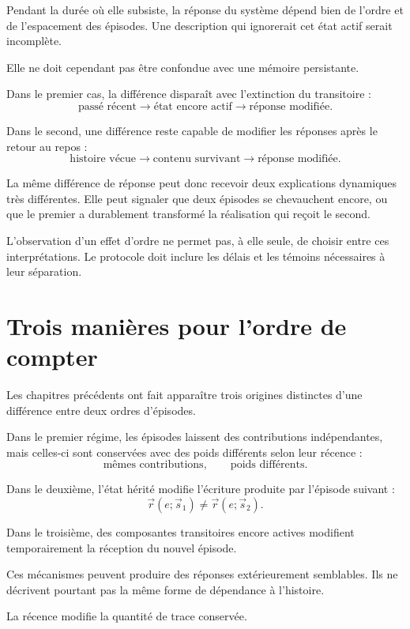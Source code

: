 Pendant la durée où elle subsiste, la réponse du système dépend bien de l'ordre et de l'espacement des épisodes. Une description qui ignorerait cet état actif serait incomplète.

Elle ne doit cependant pas être confondue avec une mémoire persistante.

Dans le premier cas, la différence disparaît avec l'extinction du transitoire :
\[
\text{passé récent}
\longrightarrow
\text{état encore actif}
\longrightarrow
\text{réponse modifiée}.
\]

Dans le second, une différence reste capable de modifier les réponses après le retour au repos :
\[
\text{histoire vécue}
\longrightarrow
\text{contenu survivant}
\longrightarrow
\text{réponse modifiée}.
\]

La même différence de réponse peut donc recevoir deux explications dynamiques très différentes. Elle peut signaler que deux épisodes se chevauchent encore, ou que le premier a durablement transformé la réalisation qui reçoit le second.

L'observation d'un effet d'ordre ne permet pas, à elle seule, de choisir entre ces interprétations. Le protocole doit inclure les délais et les témoins nécessaires à leur séparation.

\section{Trois manières pour l'ordre de compter}
\label{t3-trois-manieres-ordre}

Les chapitres précédents ont fait apparaître trois origines distinctes d'une différence entre deux ordres d'épisodes.

Dans le premier régime, les épisodes laissent des contributions indépendantes, mais celles-ci sont conservées avec des poids différents selon leur récence :
\[
\text{mêmes contributions},
\qquad
\text{poids différents}.
\]

Dans le deuxième, l'état hérité modifie l'écriture produite par l'épisode suivant :
\[
\vec r(e;\vec s_1)
\neq
\vec r(e;\vec s_2).
\]

Dans le troisième, des composantes transitoires encore actives modifient temporairement la réception du nouvel épisode.

Ces mécanismes peuvent produire des réponses extérieurement semblables. Ils ne décrivent pourtant pas la même forme de dépendance à l'histoire.

La récence modifie la quantité de trace conservée.

